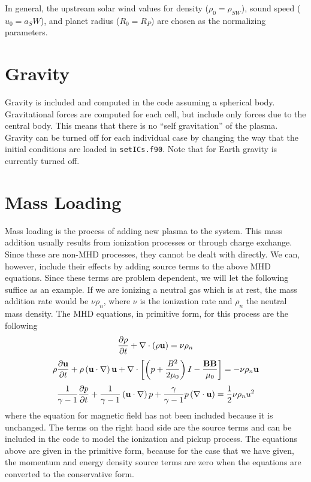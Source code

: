 In general, the upstream solar wind values for density ($\rho_0 =
\rho_{SW}$), sound speed ($u_0=a_SW$), and planet radius ($R_0 = R_P$)
are chosen as the normalizing parameters. 


\section{Gravity \label{section:gravity}}

Gravity is included and computed in the code assuming a
spherical body.  Gravitational forces are computed for each cell, but
include only forces due to the central body.  This means
that there is no ``self gravitation'' of the plasma. Gravity can
be turned off for each individual case by changing the way that 
the initial conditions are loaded in {\tt setICs.f90}.  Note that
for Earth gravity is currently turned off.

\section{Mass Loading \label{section:mass_loading}}

Mass loading is the process of adding new plasma to the system.  This
mass addition usually results from ionization processes or through
charge exchange.  Since these are non-MHD processes, they cannot be
dealt with directly.  We can, however, include their effects
by adding source terms to the above MHD equations.  Since these terms
are problem dependent, we will let the following suffice as an example.
If we are ionizing a neutral gas which is at rest, the mass addition
rate would be $\nu \rho_n$, where $\nu$ is the ionization rate and
$\rho_n$ the neutral mass density.  The MHD equations, in primitive form,
for this process are the following
\begin{equation}
\label{eq:continuity_primative_mass_loading}
\frac{\partial \rho}{\partial t} + \nabla\cdot \left(\rho {\bf u}\right)
= \nu \rho_n
\end{equation}
\begin{equation}
\label{eq:momentum_primative_mass_loading}
\rho \frac{\partial {\bf u}}{\partial t} + \rho\left({\bf u}\cdot
\nabla\right){\bf u} + \nabla \cdot \left[\left( p + \frac{B^2}{2
\mu_0}\right)I
-\frac{\bf BB}{\mu_0}\right]
 = -\nu \rho_n {\bf u}
\end{equation}
\begin{equation}
\label{eq:pressure_primative_mass_loading}
\frac{1}{\gamma-1} \frac{\partial p}{\partial t} + \frac{1}{\gamma-1}
\left({\bf u}\cdot \nabla\right)p + \frac{\gamma}{\gamma-1}
p \left(\nabla \cdot {\bf u}\right) = \frac{1}{2}\nu \rho_n u^2
\end{equation}
where the equation for magnetic field has not been included because it
is unchanged.  The terms on the right hand side are the source terms 
and can be included in the code to model the ionization and pickup
process.  The equations above are given in the primitive form, because for the
case that we have given, the momentum and energy density 
source terms are zero when the equations
are converted to the conservative form.


